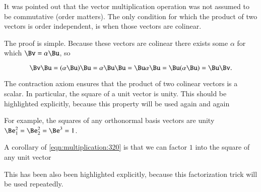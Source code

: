 %
%
It was pointed out that the vector multiplication operation was not assumed to be commutative (order matters).  The only condition for which the product of two vectors is order independent, is when those vectors are colinear.


The proof is simple.  Because these vectors are colinear there exists some \( \alpha \) for which \( \Bv = \alpha \Bu \), so

\begin{dmath}\label{eqn:multivector:380}
\Bv \Bu
=
(\alpha \Bu) \Bu
=
\alpha \Bu \Bu
=
\Bu \alpha \Bu
=
\Bu (\alpha \Bu)
=
\Bu \Bv.
\end{dmath}

The contraction axiom ensures that the product of two colinear vectors is a scalar.  
In particular, the square of a unit vector is unity. 
This should be highlighted explicitly, because this property will be used again and again

For example, the squares of any orthonormal basis vectors are unity \( \Be_1^2 = \Be_2^2 = \Be^3 = 1 \).

A corollary of 
\cref{eqn:multiplication:320} is that we can factor \( 1 \) into 
the square of any unit vector


This has been also been highlighted explicitly, because this factorization trick will be used repeatedly.
